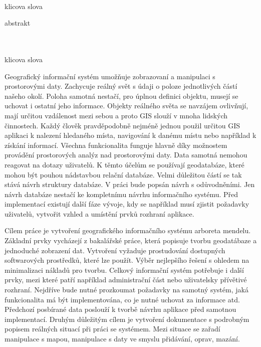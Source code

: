 \documentclass[12pt]{article}%
\begin{document}
{{}
\\
{klicova slova}

{abstrakt}
\\
\\
{{}
\\
{klicova slova}

\obsah


Geografický informační systém umožňuje zobrazovaní a manipulaci s prostorovými daty. Zachycuje 
reálný svět s údaji o poloze jednotlivých částí našeho okolí. Poloha samotná nestačí, pro úplnou 
definici objektu, musejí se uchovat i ostatní jeho informace. Objekty reálného světa se navzájem 
ovlivňují, mají určitou vzdálenost mezi sebou a proto GIS slouží v mnoha lidských činnostech. Každý
člověk pravděpodobně nejméně jednou použil určitou GIS aplikaci k nalezení hledaného místa, 
navigování k danému místu nebo například k získání informací. Všechna funkcionalita funguje hlavně 
díky možnostem provádění prostorových analýz nad prostorovými daty. Data samotná nemohou reagovat 
na dotazy uživatelů. K těmto účelům se používají geodatabáze, které mohou být pouhou nádstavbou 
relační databáze. Velmi důležitou částí se tak stává návrh struktury databáze. V práci bude popsán 
návrh s odůvodněními. Jen návrh databáze nestačí ke kompletnímu návrhu informačního systému. Před 
implementací existují další fáze vývoje, kdy se například musí zjistit požadavky uživatelů, vytvořit
vzhled a umístění prvků rozhraní aplikace.

Cílem práce je vytvoření geografického informačního systému arboreta mendelu. Základní prvky 
vycházejí z bakalářské práce, která popisuje tvorbu geodatábaze a jednoduché zobrazení dat. 
Vytvoření vyžaduje prostudování dostupných softwarových prostředků, které lze použít. Výběr 
nejlepšího řešení s ohledem na minimalizaci nákladů pro tvorbu. Celkový informační systém potřebuje 
i další prvky, mezi které patří například administrační část nebo uživatelsky přívětivé rozhraní. 
Nejdříve bude nutné prozkoumat požadavky na samotný systém, jaká funkcionalita má být implementována, 
co je nutné uchovat za informace atd. Předchozí posbírané data poslouží k tvorbě návrhu aplikace 
před samotnou implementací. Druhým důležitým cílem je vytvoření dokumentace s podrobným popisem 
reálných situací při práci se systémem. Mezi situace se zařadí manipulace s mapou, manipulace s daty 
ve smyslu přidávání, oprav, mazání.

}}
\end{document}
